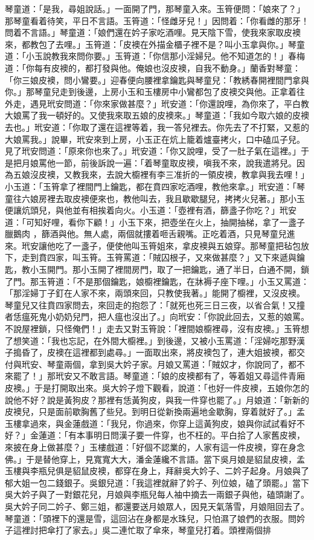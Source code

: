 琴童道：「是我，尋姐說話。」一面開了門，那琴童入來。玉筲便問：「娘來了？」那琴童看着待笑，平日不言語。玉筲道：「怪雌牙兒！」因問着：「你看雌的那牙！問着不言語。」琴童道：「娘們還在妗子家吃酒哩。見天陰下雪，使我來家取皮襖來，都教包了去哩。」玉筲道：「皮襖在外描金櫃子裡不是？叫小玉拿與你。」琴童道：「小玉說教我來問你要。」玉筲道：「你信那小淫婦兒。他不知道怎的！」春梅道：「你每有皮襖的，都打發與他。俺娘也沒皮襖，自我不動身。」蘭香對琴童：「你三娘皮襖，問小鸞要。」迎春便向腰裡拿鑰匙與琴童兒：「教綉春開裡間門拿與你。」那琴童兒走到後邊，上房小玉和玉樓房中小鸞都包了皮襖交與他。正拿着往外走，遇見玳安問道：「你來家做甚麼？」玳安道：「你還說哩，為你來了，平白教大娘罵了我一頓好的。又使我來取五娘的皮襖來。」琴童道：「我如今取六娘的皮襖去也。」玳安道：「你取了還在這裡等着，我一答兒裡去。你先去了不打緊，又惹的大娘罵我。」說畢，玳安來到上房，小玉正在炕上籠着爐臺拷火，口中磕瓜子兒。見了玳安問道：「原來你也來了。」玳安道：「你又說哩，受了一肚子氣在這裡。」于是把月娘罵他一節，前後訴說一遍：「着琴童取皮襖，嗔我不來，說我遣將兒。因為五娘沒皮襖，又教我來，去說大櫥裡有李三准折的一領皮襖，教拿與我去哩！」小玉道：「玉筲拿了裡間門上鑰匙，都在賁四家吃酒哩，教他來拿。」玳安道：「琴童往六娘房裡去取皮襖便來也，教他叫去，我且歇歇腿兒，拷拷火兒著。」那小玉便讓炕頭兒，與他並有相挨着向火。小玉道：「壺裡有酒，篩盞子你吃？」玳安道：「可知好哩，看你下顧！」小玉下來，把壺坐在火上，抽開抽梯，拿了一盞子臘鵝肉 ，篩酒與他。無人處，兩個就摟着咂舌親嘴。正吃着酒，只見琴童兒進來。玳安讓他吃了一盞子，便使他叫玉筲姐來，拿皮襖與五娘穿。那琴童把毡包放下，走到賁四家，叫玉筲。玉筲罵道：「賊囚根子，又來做甚麼？」又下來遞與鑰匙，教小玉開門。那小玉開了裡間房門，取了一把鑰匙，通了半日，白通不開，鎖了門。那玉筲道：「不是那個鑰匙，娘櫥裡鑰匙，在牀褥子座下哩。」小玉又罵道：「那淫婦丁子釘在人家不來，兩頭來回，只教使我著。」能開了櫥裡，又沒皮襖。琴童兒又往賁四家問去，來回走的抱怨了：「就死也死三日三夜，以省合氣！又撞者恁瘟死鬼小奶奶兒門，把人瘟也沒出了。」向玳安：「你說此回去，又惹的娘罵。不說屋裡鎖，只怪俺們！」走去又對玉筲說：「裡間娘櫥裡尋，沒有皮襖。」玉筲想了想笑道：「我也忘記，在外間大櫥裡。」到後邊，又被小玉罵道：「淫婦吃那野漢子搗昏了，皮襖在這裡都到處尋。」一面取出來，將皮襖包了，連大姐披襖，都交付與玳安、琴童兩個，拿到吳大妗子家。月娘又罵道：「賊奴才，你說同了，都不來罷了！」那玳安又不敢言語。琴童道：「娘的皮襖都有了，等着姐又尋這件青廂皮襖。」于是打開取出來。吳大妗子燈下觀看，說道：「也好一件皮襖，五娘你怎的說他不好？說是黃狗皮？那裡有恁黃狗皮，與我一件穿也罷了。」月娘道：「新新的皮襖兒，只是面前歇胸舊了些兒。到明日從新換兩遍地金歇胸，穿着就好了。」孟玉樓拿過來，與金蓮戲道：「我兒，你過來，你穿上這黃狗皮，娘與你試試看好不好？」金蓮道：「有本事明日問漢子要一件穿，也不枉的。平白拾了人家舊皮襖，來披在身上做甚麼？」玉樓戲道：「好個不認業的，人家有這一件皮襖，穿在身念佛。」于是替他穿上，見寬寬大大，潘金蓮纔不言語。當下吳月娘是貂鼠皮襖，孟玉樓與李瓶兒俱是貂鼠皮襖，都穿在身上，拜辭吳大妗子、二妗子起身。月娘與了郁大姐一包二錢銀子。吳銀兒道：「我這裡就辭了妗子、列位娘，磕了頭罷。」當下吳大妗子與了一對銀花兒，月娘與李瓶兒每人袖中摘去一兩銀子與他，磕頭謝了。吳大妗子同二妗子、鄭三姐，都還要送月娘眾人，因見天氣落雪，月娘阻回去了。琴童道：「頭裡下的還是雪，這回沾在身都是水珠兒，只怕濕了娘們的衣服。問妗子這裡討把傘打了家去。」吳二連忙取了傘來，琴童兒打着。頭裡兩個排